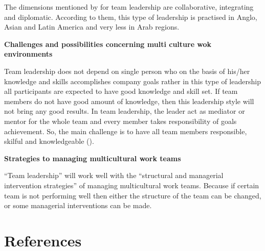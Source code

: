 \documentclass{article}
\begin{document}
The dimensions mentioned by \cite{steers2013management} for team leadership are collaborative, integrating and diplomatic. According to them, this type of leadership is practised in Anglo, Asian and Latin America and very less in Arab regions. 

\textbf{Challenges and possibilities concerning multi culture wok environments}

Team leadership does not depend on single person who on the basis of his/her knowledge and skills accomplishes company goals rather in this type of leadership all participants are expected to have good knowledge and skill set. If team members do not have good amount of knowledge, then this leadership style will not bring any good results. In team leadership, the leader act as mediator or mentor for the whole team and every member takes responsibility of goals achievement. So, the main challenge is to have all team members responsible, skilful and knowledgeable (\cite{Cutajar2020}). 

\textbf{Strategies to managing multicultural work teams}

“Team leadership” will work well with the “structural and managerial intervention strategies” of managing multicultural work teams. Because if certain team is not performing well then either the structure of the team can be changed, or some managerial interventions can be made. 


\section{References}


% 
% 

\printbibliography
\end{document}
